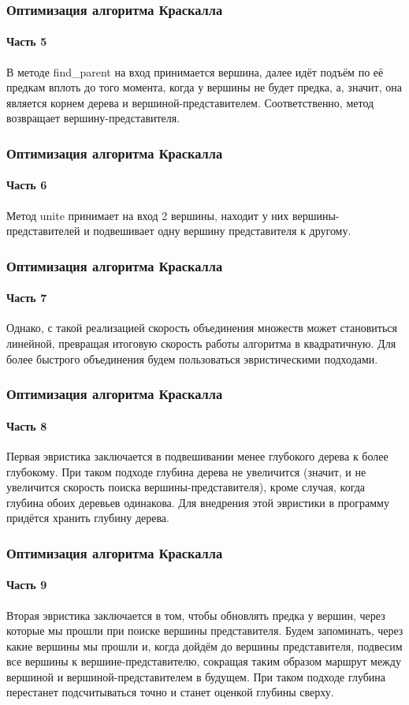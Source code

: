 \documentclass[aspectratio=169]{beamer}
\begin{document}
\begin{frame}
	\frametitle{Оптимизация алгоритма Краскалла}
	\framesubtitle{Часть 5}
	\hspace{0.5cm}В методе find\_parent на вход принимается вершина, далее идёт подъём по её предкам вплоть до того момента, когда у вершины не будет предка, а, значит, она является корнем дерева и вершиной-представителем. Соответственно, метод возвращает вершину-представителя.
\end{frame}

\begin{frame}
	\frametitle{Оптимизация алгоритма Краскалла}
	\framesubtitle{Часть 6}
	\hspace{0.5cm}Метод unite принимает на вход 2 вершины, находит у них вершины-представителей и подвешивает одну вершину представителя к другому.
\end{frame}

\begin{frame}
	\frametitle{Оптимизация алгоритма Краскалла}
	\framesubtitle{Часть 7}
	\hspace{0.5cm}Однако, с такой реализацией скорость объединения множеств может становиться линейной, превращая итоговую скорость работы алгоритма в квадратичную. Для более быстрого объединения будем пользоваться эвристическими подходами.
\end{frame}

\begin{frame}
	\frametitle{Оптимизация алгоритма Краскалла}
	\framesubtitle{Часть 8}
	\hspace{0.5cm}Первая эвристика заключается в подвешивании менее глубокого дерева к более глубокому. При таком подходе глубина дерева не увеличится (значит, и не увеличится скорость поиска вершины-представителя), кроме случая, когда глубина обоих деревьев одинакова. Для внедрения этой эвристики в программу придётся хранить глубину дерева.
\end{frame}

\begin{frame}
	\frametitle{Оптимизация алгоритма Краскалла}
	\framesubtitle{Часть 9}
	\hspace{0.5cm}Вторая эвристика заключается в том, чтобы обновлять предка у вершин, через которые мы прошли при поиске вершины представителя. Будем запоминать, через какие вершины мы прошли и, когда дойдём до вершины представителя, подвесим все вершины к вершине-представителю, сокращая таким образом маршрут между вершиной и вершиной-представителем в будущем. При таком подходе глубина перестанет подсчитываться точно и станет оценкой глубины сверху.
\end{frame}
\end{document}
